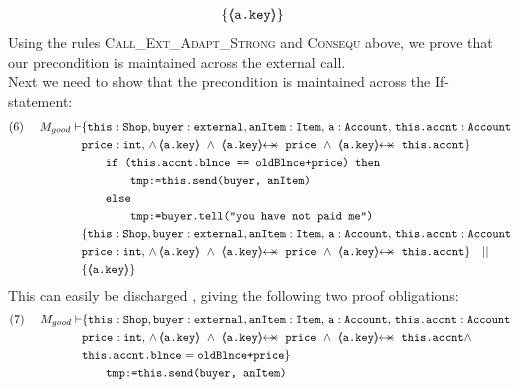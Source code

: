 \begin{proofO}
\begin{align*}
		  		& \{ {\langle\!\!\langle \mbox{\normalfont{\texttt{a.key}}} \rangle\!\!\rangle} \}
\end{align*}
\normalsize
Using the rules \textsc{Call\_Ext\_Adapt\_Strong} and \textsc{Consequ} above, we prove that our precondition is maintained across the external call. 
\\
Next we need to show that the precondition is maintained across the If-statement:
\small
\begin{align*}
\text{(6)}  \ \ \ \ M_{good} \vdash & \{  \prg{this}:\prg{Shop}, \prg{buyer} : \prg{external}, \prg{anItem} : \prg{Item},\, \prg{a}:\prg{Account},\, \prg{this.accnt}:\prg{Account}\\
				& \prg{price} : \prg{int},\,
				  \wedge\, 
				  {\inside{\prg{a.key}}}\ \wedge\ 
				  \protectedFrom{\prg{a.key}}{\prg{price}}\ \wedge\ 
				   \protectedFrom{\prg{a.key}}{\prg{this.accnt}}\} \\
		  		&\SPT \prg{if (this.accnt.blnce == oldBlnce+price) then} \\
				 &\SPT \SPT \prg{tmp:=this.send(buyer, anItem)}\ \\  
				&\SPT  \prg{else} \\
				 &\SPT\SPT  \prg{tmp:=buyer.tell("you have not paid me")}\\
		  		& \{  \prg{this}:\prg{Shop}, \prg{buyer} : \prg{external}, \prg{anItem} : \prg{Item},\, \prg{a}:\prg{Account},\, \prg{this.accnt}:\prg{Account}\\
				& \prg{price} : \prg{int},\,
				  \wedge\, 
				  {\inside{\prg{a.key}}}\ \wedge\ 
				  \protectedFrom{\prg{a.key}}{\prg{price}}\ \wedge\ 
				   \protectedFrom{\prg{a.key}}{\prg{this.accnt}}\} \ \ \  || \ \ \ \\
		  		& \{ {\inside{\prg{a.key}}} \}
\end{align*}
\normalsize
This can easily be discharged \sdN{using   {\sc{If\_Rule}}}, giving the following two proof obligations:
\small
\begin{align*}
\text{(7)}  \ \ \ \ M_{good} \vdash & \{  \prg{this}:\prg{Shop}, \prg{buyer} : \prg{external}, \prg{anItem} : \prg{Item},\, \prg{a}:\prg{Account},\, \prg{this.accnt}:\prg{Account}\\
				& \prg{price} : \prg{int},\,
				  \wedge\, 
				  {\inside{\prg{a.key}}}\ \wedge\ 
				  \protectedFrom{\prg{a.key}}{\prg{price}}\ \wedge\ 
				   \protectedFrom{\prg{a.key}}{\prg{this.accnt}} \wedge \\
				&  \prg{this.accnt.blnce} = \prg{oldBlnce+price}\} \\
		  		&\SPT  \prg{tmp:=this.send(buyer, anItem)}\ \\  

\end{align*}
\end{proofO}

